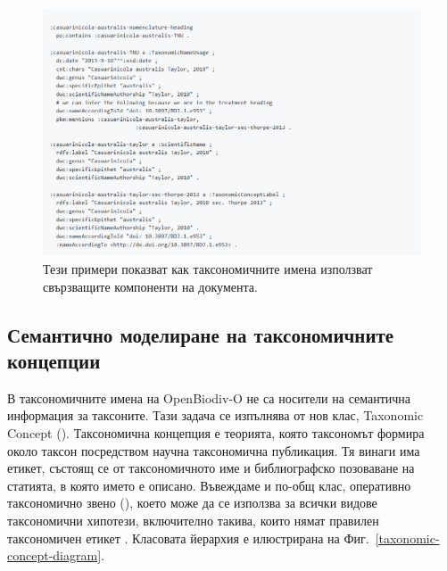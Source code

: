 \begin{figure}[h!]
\centering
  \includegraphics[width=\textwidth]{Figures/example-taxonomic-name-usage}
  \decoRule
  \caption[Example taxonomic name usage.]{
  Тези примери показват как таксономичните имена използват свързващите компоненти на документа.}
  \label{example-taxonomic-name-usage}
\end{figure}

\subsection{Семантично моделиране на таксономичните концепции}

В таксономичните имена на OpenBiodiv-O не са носители на семантична информация за таксоните. Тази задача се изпълнява от нов клас, Taxonomic Concept (). Таксономична концепция е теорията, която таксономът формира около таксон посредством научна таксономична публикация. Тя винаги има етикет, състоящ се от таксономичното име и библиографско позоваване на статията, в която името е описано. Въвеждаме и по-общ клас, оперативно таксономично звено (), което може да се използва за всички видове таксономични хипотези, включително такива, които нямат правилен таксономичен етикет . Класовата йерархия е илюстрирана на Фиг.~\ref{taxonomic-concept-diagram}.

